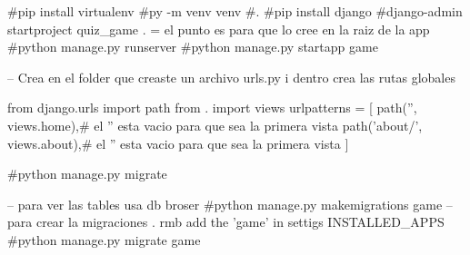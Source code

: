 #pip install virtualenv
#py -m venv venv
#.\venv\Scripts\Activate
#pip install django
#django-admin startproject quiz_game . = el punto es para que lo cree en la raiz de la app
#python manage.py runserver
#python manage.py startapp game

-- Crea en el folder que creaste un archivo urls.py i dentro crea las rutas globales 

from django.urls import path
from . import views
urlpatterns = [
    path('', views.home),# el  '' esta vacio para que sea la primera vista 
    path('about/', views.about),# el  '' esta vacio para que sea la primera vista 
]

#python manage.py migrate

-- para ver las tables usa db broser 
#python manage.py makemigrations game  -- para crear la migraciones . rmb add the 'game' in settigs INSTALLED_APPS
#python manage.py migrate game  












